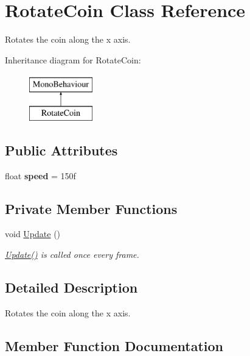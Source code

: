 \hypertarget{class_rotate_coin}{}\section{Rotate\+Coin Class Reference}
\label{class_rotate_coin}


Rotates the coin along the x axis.  


Inheritance diagram for Rotate\+Coin\+:\begin{figure}[H]
\begin{center}
\leavevmode
\includegraphics[height=2.000000cm]{class_rotate_coin}
\end{center}
\end{figure}
\subsection*{Public Attributes}
\begin{DoxyCompactItemize}
\item 
\mbox{\label{class_rotate_coin_ac3eb54a20b3f3df2cce9f1df7add845d}} 
float {\bfseries speed} = 150f
\end{DoxyCompactItemize}
\subsection*{Private Member Functions}
\begin{DoxyCompactItemize}
\item 
void \mbox{\hyperlink{class_rotate_coin_a5d9d210187f1beb0d908850a72ebf7df}{Update}} ()
\begin{DoxyCompactList}\small\item\em \mbox{\hyperlink{class_rotate_coin_a5d9d210187f1beb0d908850a72ebf7df}{Update()}} is called once every frame. \end{DoxyCompactList}\end{DoxyCompactItemize}


\subsection{Detailed Description}
Rotates the coin along the x axis. 

\subsection{Member Function Documentation}
\mbox{\label{class_rotate_coin_a5d9d210187f1beb0d908850a72ebf7df}} 
